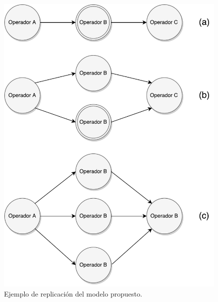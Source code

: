 \begin{figure}[!hb]
	\centering
		\includegraphics[scale=0.6]{images/EjReplicacion.pdf}
	\caption{Ejemplo de replicación del modelo propuesto.}
	\label{fig:ejReplicacion}
\end{figure}


